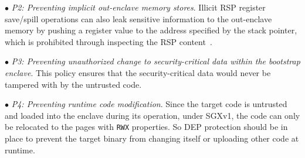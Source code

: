 \vspace{2pt}\noindent$\bullet$\textit{ P2: Preventing implicit out-enclave memory stores}. Illicit RSP register save/spill operations can also leak sensitive information to the out-enclave memory by pushing a register value to the address specified by the stack pointer, which is prohibited through inspecting the RSP content~\cite{wang2018detect}.  
    
\vspace{2pt}\noindent$\bullet$\textit{ P3: Preventing unauthorized change to security-critical data within the bootstrap enclave}. This policy ensures that the security-critical data would never be tampered with by the untrusted code.



\vspace{2pt}\noindent$\bullet$\textit{ P4: Preventing runtime code modification}. Since the target code is untrusted and loaded into the enclave during its operation, under SGXv1, the code can only be relocated to the pages with \texttt{RWX} properties. So DEP protection should be in place to prevent the target binary from changing itself or uploading other code at runtime. 

